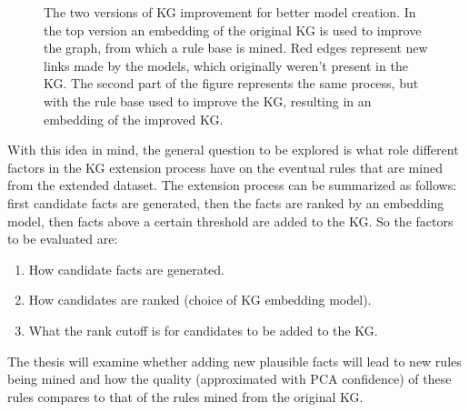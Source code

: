 \begin{figure}[htp]
    \centering
    
    \caption[Figure representing the process.]{The two versions of KG improvement for better model creation. In the top version an embedding of the original KG is used to improve the graph, from which a rule base is mined. Red edges represent new links made by the models, which originally weren't present in the KG. The second part of the figure represents the same process, but with the rule base used to improve the KG, resulting in an embedding of the improved KG.}
    \label{rule_based_and_embedding}
\end{figure}

With this idea in mind, the general question to be explored is what role different factors in the KG extension process have on the eventual rules that are mined from the extended dataset. The extension process can be summarized as follows: first candidate facts are generated, then the facts are ranked by an embedding model, then facts above a certain threshold are added to the KG. So the factors to be evaluated are:
\begin{enumerate}
    \item How candidate facts are generated.
    \item How candidates are ranked (choice of KG embedding model).
    \item What the rank cutoff is for candidates to be added to the KG.
\end{enumerate}

The thesis will examine whether adding new plausible facts will lead to new rules being mined and how the quality (approximated with PCA confidence) of these rules compares to that of the rules mined from the original KG.



